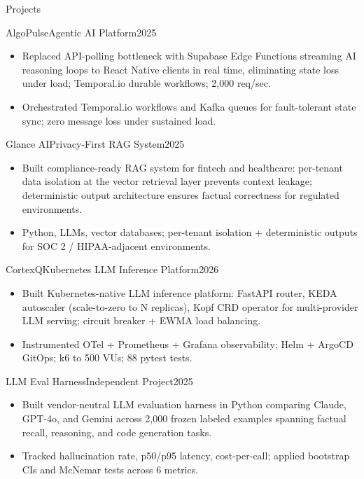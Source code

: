 \documentclass[]{mcdowellcv}
\begin{document}
\begin{cvsection}{Projects}
  \begin{cvsubsection}{AlgoPulse}{Agentic AI Platform}{2025}
    \begin{itemize}
      \item Replaced API-polling bottleneck with Supabase Edge Functions streaming AI reasoning loops to React Native clients in real time, eliminating state loss under load; Temporal.io durable workflows; 2,000 req/sec.
      \item Orchestrated Temporal.io workflows and Kafka queues for fault-tolerant state sync; zero message loss under sustained load.
    \end{itemize}
    \vspace{-1.5pt}
  \end{cvsubsection}

  \begin{cvsubsection}{Glance AI}{Privacy-First RAG System}{2025}
    \begin{itemize}
      \item Built compliance-ready RAG system for fintech and healthcare: per-tenant data isolation at the vector retrieval layer prevents context leakage; deterministic output architecture ensures factual correctness for regulated environments.
      \item Python, LLMs, vector databases; per-tenant isolation + deterministic outputs for SOC 2 / HIPAA-adjacent environments.
    \end{itemize}
    \vspace{-1.5pt}
  \end{cvsubsection}

  \begin{cvsubsection}{CortexQ}{Kubernetes LLM Inference Platform}{2026}
    \begin{itemize}
      \item Built Kubernetes-native LLM inference platform: FastAPI router, KEDA autoscaler (scale-to-zero to N replicas), Kopf CRD operator for multi-provider LLM serving; circuit breaker + EWMA load balancing.
      \item Instrumented OTel + Prometheus + Grafana observability; Helm + ArgoCD GitOps; k6 to 500 VUs; 88 pytest tests.
    \end{itemize}
    \vspace{-1.5pt}
  \end{cvsubsection}

  \begin{cvsubsection}{LLM Eval Harness}{Independent Project}{2025}
    \begin{itemize}
      \item Built vendor-neutral LLM evaluation harness in Python comparing Claude, GPT-4o, and Gemini across 2,000 frozen labeled examples spanning factual recall, reasoning, and code generation tasks.
      \item Tracked hallucination rate, p50/p95 latency, cost-per-call; applied bootstrap CIs and McNemar tests across 6 metrics.
    \end{itemize}
  \end{cvsubsection}
\end{cvsection}
\end{document}
